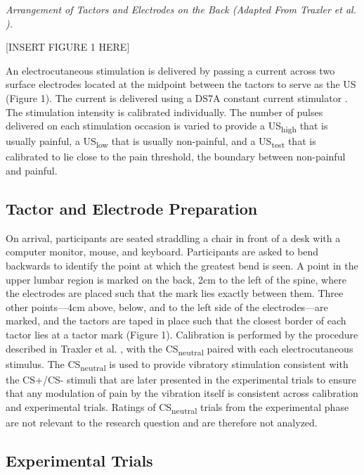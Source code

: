 \documentclass{article}
\begin{document}
\emph{Arrangement of Tactors and Electrodes on the Back (Adapted From Traxler et al. }\parencite{Traxler2019}\emph{).}

[INSERT FIGURE 1 HERE]

An electrocutaneous stimulation is delivered by passing a current across two surface electrodes located at the midpoint between the tactors to serve as the US (Figure 1). The current is delivered using a DS7A constant current stimulator \parencite{Digitimer Limited0}. The stimulation intensity is calibrated individually. The number of pulses delivered on each stimulation occasion is varied to provide a US\textsubscript{high} that is usually painful, a US\textsubscript{low} that is usually non-painful, and a US\textsubscript{test} that is calibrated to lie close to the pain threshold, the boundary between non-painful and painful.

\subsection{Tactor and Electrode Preparation}

On arrival, participants are seated straddling a chair in front of a desk with a computer monitor, mouse, and keyboard. Participants are asked to bend backwards to identify the point at which the greatest bend is seen. A point in the upper lumbar region is marked on the back, 2cm to the left of the spine, where the electrodes are placed such that the mark lies exactly between them. Three other points—4cm above, below, and to the left side of the electrodes—are marked, and the tactors are taped in place such that the closest border of each tactor lies at a tactor mark (Figure 1). Calibration is performed by the procedure described in Traxler et al. \parencite{Traxler2019}, with the CS\textsubscript{neutral} paired with each electrocutaneous stimulus. The CS\textsubscript{neutral} is used to provide vibratory stimulation consistent with the CS+/CS- stimuli that are later presented in the experimental trials to ensure that any modulation of pain by the vibration itself is consistent across calibration and experimental trials. Ratings of CS\textsubscript{neutral} trials from the experimental phase are not relevant to the research question and are therefore not analyzed.

\subsection{Experimental Trials}
\end{document}
